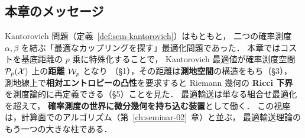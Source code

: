 \subsection{本章のメッセージ}

\begin{memo*}
  Kantorovich 問題（定義~\ref{def:sem-kantorovich}）はもともと，
  二つの確率測度 $\alpha, \beta$ を結ぶ「最適なカップリングを探す」最適化問題であった．
  本章ではコストを基底距離の $p$ 乗に特殊化することで，
  Kantorovich 最適値が確率測度空間 $\mathcal{P}_p(\mathcal{X})$ 上の\textbf{距離} $\mathcal{W}_p$ となり
  （§1），その距離は\textbf{測地空間}の構造をもち（§3），
  測地線上で\textbf{相対エントロピーの凸性}を要求すると Riemann 幾何の
  \textbf{Ricci 下界} を測度論的に再定義できる（§5）ことを見た．
  最適輸送は単なる組合せ最適化を超えて，
  \textbf{確率測度の世界に微分幾何を持ち込む装置}として働く．
  この視座は，計算面でのアルゴリズム（第~\ref{ch:seminar-02}~章）と並ぶ，
  最適輸送理論のもう一つの大きな柱である．
\end{memo*}

